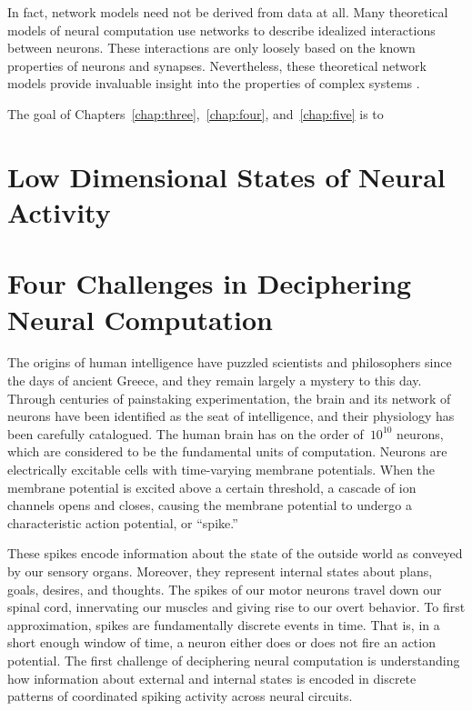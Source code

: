 In fact, network models need not be derived from data at all.  Many
theoretical models of neural computation use networks to describe
idealized interactions between neurons. These interactions are only
loosely based on the known properties of neurons and
synapses. Nevertheless, these theoretical network models provide
invaluable insight into the properties of complex systems
\cite{hopfield1982neural, amit1992modeling, van1996chaos, DayanAbbott,
  sussillo2009generating}.



The goal of Chapters~\ref{chap:three},~\ref{chap:four},
and~\ref{chap:five} is to 


\section{Low Dimensional States of Neural Activity}


\section{Four Challenges in Deciphering Neural Computation}
The origins of human intelligence have puzzled scientists and
philosophers since the days of ancient Greece, and they remain largely
a mystery to this day. Through centuries of painstaking
experimentation, the brain and its network of neurons have been
identified as the seat of intelligence, and their physiology has been
carefully catalogued. The human brain has on the order
of~$\text{10}^{\text{10}}$ neurons, which are considered to be the
fundamental units of computation. Neurons are electrically excitable
cells with time-varying membrane potentials. When the membrane
potential is excited above a certain threshold, a cascade of ion
channels opens and closes, causing the membrane potential to undergo a
characteristic action potential, or ``spike.''

These spikes encode information about the state of the outside world
as conveyed by our sensory organs. Moreover, they represent internal
states about plans, goals, desires, and thoughts. The spikes of our
motor neurons travel down our spinal cord, innervating our muscles and
giving rise to our overt behavior. To first approximation, spikes are
fundamentally discrete events in time.  That is, in a short enough
window of time, a neuron either does or does not fire an action
potential.  The first challenge of deciphering neural computation is
understanding how information about external and internal states is
encoded in discrete patterns of coordinated spiking activity across
neural circuits.

